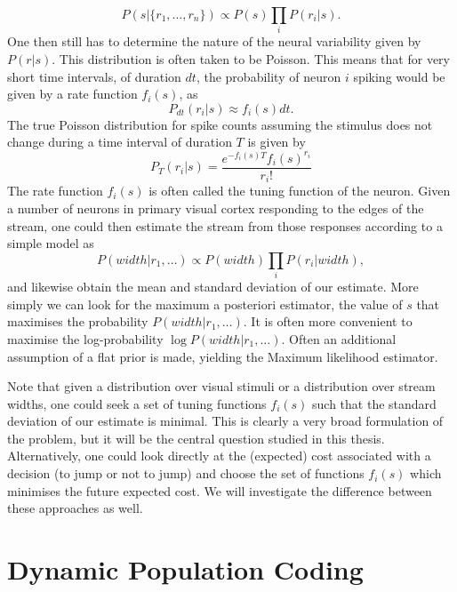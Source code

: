 \[
P(s|\{r_1,\ldots,r_n\}) \propto P(s) \prod_i P(r_i|s).
\]
One then still has to determine the nature of the neural variability given by $P(r|s)$. This distribution is often taken to be Poisson. This means that for very short time intervals, of duration $dt$, the probability of neuron $i$ spiking would be given by a rate function $f_i(s)$, as
\[
P_{dt}(r_i|s) \approx f_i(s) dt.
\]
The true Poisson distribution for spike counts assuming the stimulus does not change during a time interval of duration $T$ is given by
\[
P_T(r_i|s) = \frac{e^{-f_i(s) T}f_i(s)^{r_i}}{r_i!}
\]
The rate function $f_i(s)$ is often called the tuning function of the neuron. Given a number of neurons in primary visual cortex responding to the edges of the stream, one could then estimate the stream from those responses according to a simple model as
\[
P(width|{r_1,\ldots}) \propto P(width) \prod_i P(r_i|width),
\]
and likewise obtain the mean and standard deviation of our estimate. More simply we can look for the maximum a posteriori estimator, the value of $s$ that maximises
the probability $P(width|{r_1,\ldots})$. It is often more convenient to maximise the log-probability $\log P(width|{r_1,\ldots})$. Often an additional assumption of a flat
prior is made, yielding the Maximum likelihood estimator.
\par
Note that given a distribution over visual stimuli or a distribution over stream widths, one could seek a set of tuning functions $f_i(s)$ such that the standard deviation 
of our estimate is minimal. This is clearly a very broad formulation of the problem, but it will be the central question studied in this thesis. Alternatively, one could look
directly at the (expected) cost associated with a decision (to jump or not to jump) and choose the set of functions $f_i(s)$ which minimises the future expected cost.
We will investigate the difference between these approaches as well.

\section{Dynamic Population Coding}

